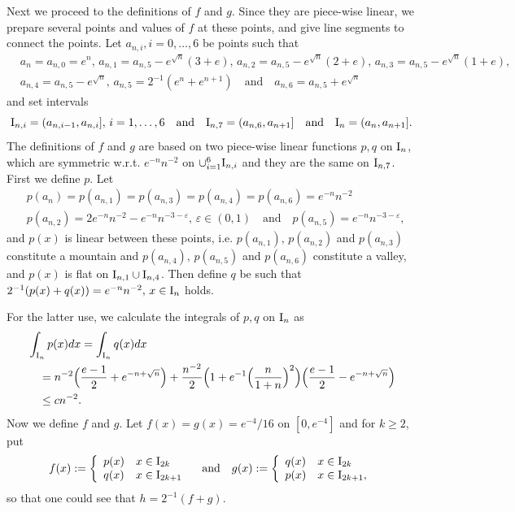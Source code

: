 \documentclass[12pt,leqno]{amsart}
\newcommand{\rI}{{\rm I}}
\newcommand{\vep}{\varepsilon}
\newcommand{\1}{{\mathbf 1}}
\begin{document}
Next we proceed to the definitions of $f$ and $g$. Since they are piece-wise linear,  
we prepare several points and values of $f$ at these points, and give line segments to 
connect the points. 
Let $a_{n,i},i=0,\ldots,6$ be points such that 
\begin{align*}
& a_n=a_{n,0}=e^n,\,a_{n,1}=a_{n,5}-e^{\sqrt{n}}(3+e),\,a_{n,2}=a_{n,5}-e^{\sqrt{n}}(2+e),\, 
a_{n,3}= a_{n,5} - e^{\sqrt{n}}(1+e),\\
& a_{n,4}= a_{n,5} - e^{\sqrt{n}},\, a_{n,5}=2^{-1}(e^n+e^{n+1})\quad \text{and}\quad a_{n,6}= a_{n,5}+e^{\sqrt{n}}
\end{align*}
and set intervals 
\[
 \rI_{n,i}=(a_{n,i-1},a_{n,i}],\,i=1,\ldots,6\quad \text{and}\quad \rI_{n,7}=(a_{n,6},a_{n+1}]\quad \text{and}\quad 
\rI_n=(a_n,a_{n+1}]. 
\]
The definitions of $f$ and $g$ are based on 
two piece-wise linear functions $p,q$ on $\rI_n$, which are symmetric w.r.t. $e^{-n}n^{-2}$ on $\cup_{i=1}^6 \rI_{n,i}$ and 
they are the same on $\rI_{n,7}$. First we define 
$p$. 
Let 
\begin{align*}
& p(a_n)=p(a_{n,1})=p(a_{n,3})=p(a_{n,4})=p(a_{n,6})=e^{-n}n^{-2} \\
& p(a_{n,2})=2 e^{-n}n^{-2} -e^{-n}n^{-3-\vep},\,\vep\in(0,1)\quad \text{and}\quad p(a_{n,5})=e^{-n}n^{-3-\vep}, 
\end{align*}
and $p(x)$ is linear between these points, i.e. $p(a_{n,1}),\,p(a_{n,2})$ and $p(a_{n,3})$ constitute a mountain and 
$p(a_{n,4}),\,p(a_{n,5})$ and $p(a_{n,6})$ constitute a valley, and $p(x)$ is flat on $\rI_{n,1}\cup \rI_{n,4}$. 
Then define $q$ be such that $2^{-1}(p(x)+q(x))=e^{-n}n^{-2},\,x\in \rI_n$ holds.

For the latter use, we calculate the integrals of $p,q$ on $\rI_n$ as 
\begin{align}
\label{ex1:integral}
\begin{split}
& \int_{\rI_n}p(x)dx = \int_{\rI_n}q(x)dx \\
&\quad  =n^{-2} \Big(
\frac{e-1}{2}+e^{-n+\sqrt{n}}
\Big)+\frac{n^{-2}}{2} \Big(
1+e^{-1}\Big(\frac{n}{1+n}\Big)^2
\Big)\Big(
\frac{e-1}{2}-e^{-n+\sqrt{n}}
\Big) \\
&\quad \le cn^{-2}.
\end{split}
\end{align}
Now we define $f$ and $g$. Let $f(x)=g(x)=e^{-4}/16$ on $[0,e^{-4}]$ and for $k\ge 2$, put 
\begin{align*}
 f(x):=\left\{
\begin{array}{ll}
p(x) & x\in \rI_{2k}  \\
q(x) & x\in \rI_{2k+1} 
\end{array}
\right.\quad \text{and} \quad 
 g(x):=\left\{
\begin{array}{ll}
q(x) & x\in \rI_{2k}  \\
p(x) & x\in \rI_{2k+1},  
\end{array}
\right.
\end{align*}
so that one could see that $h=2^{-1}(f+g)$. 
\end{document}
